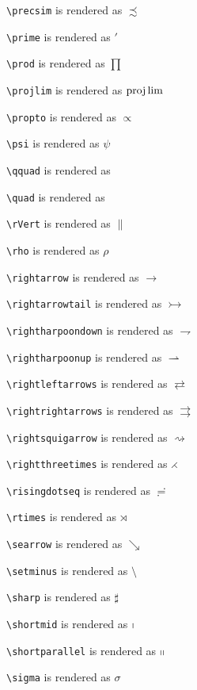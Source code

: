 \texttt{\textbackslash precsim} is rendered as $\precsim$

\texttt{\textbackslash prime} is rendered as $\prime$

\texttt{\textbackslash prod} is rendered as $\prod$

\texttt{\textbackslash projlim} is rendered as $\projlim$

\texttt{\textbackslash propto} is rendered as $\propto$

\texttt{\textbackslash psi} is rendered as $\psi$

\texttt{\textbackslash qquad} is rendered as $\qquad$

\texttt{\textbackslash quad} is rendered as $\quad$

\texttt{\textbackslash rVert} is rendered as $\rVert$

\texttt{\textbackslash rho} is rendered as $\rho$

\texttt{\textbackslash rightarrow} is rendered as $\rightarrow$

\texttt{\textbackslash rightarrowtail} is rendered as $\rightarrowtail$

\texttt{\textbackslash rightharpoondown} is rendered as $\rightharpoondown$

\texttt{\textbackslash rightharpoonup} is rendered as $\rightharpoonup$

\texttt{\textbackslash rightleftarrows} is rendered as $\rightleftarrows$

\texttt{\textbackslash rightrightarrows} is rendered as $\rightrightarrows$

\texttt{\textbackslash rightsquigarrow} is rendered as $\rightsquigarrow$

\texttt{\textbackslash rightthreetimes} is rendered as $\rightthreetimes$

\texttt{\textbackslash risingdotseq} is rendered as $\risingdotseq$

\texttt{\textbackslash rtimes} is rendered as $\rtimes$

\texttt{\textbackslash searrow} is rendered as $\searrow$

\texttt{\textbackslash setminus} is rendered as $\setminus$

\texttt{\textbackslash sharp} is rendered as $\sharp$

\texttt{\textbackslash shortmid} is rendered as $\shortmid$

\texttt{\textbackslash shortparallel} is rendered as $\shortparallel$

\texttt{\textbackslash sigma} is rendered as $\sigma$

